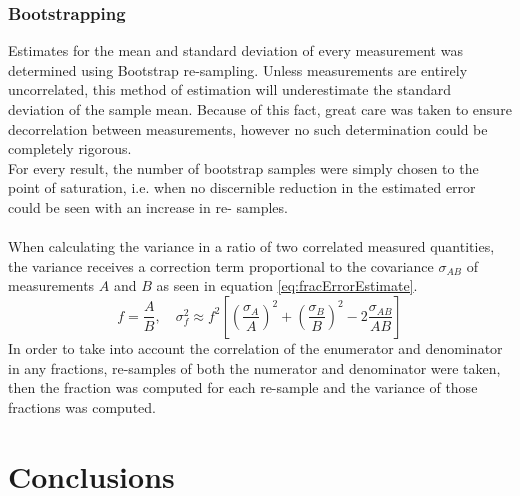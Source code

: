 \documentclass[a4paper,10pt]{book}
\begin{document}
\subsection{Bootstrapping}
Estimates for the mean and standard deviation of every measurement was determined using Bootstrap re-sampling. Unless measurements are entirely uncorrelated, this method of estimation will underestimate the standard deviation of the sample mean. Because of this fact, great care was taken to ensure decorrelation between measurements, however no such determination could be completely rigorous.\\For every result, the number of bootstrap samples were simply chosen to the point of saturation, i.e. when no discernible  reduction in the estimated error could be seen with an increase in re- samples.\\\\When calculating the variance in a ratio of two correlated measured quantities, the variance receives a correction term proportional to the covariance $\sigma_{A B}$ of measurements $A$ and $B$ as seen in equation \eqref{eq:fracErrorEstimate}.
\begin{equation}\label{eq:fracErrorEstimate}
f=\frac{A}{B}, \quad \sigma_{f}^{2} \approx f^{2}\left[\left(\frac{\sigma_{A}}{A}\right)^{2}+\left(\frac{\sigma_{B}}{B}\right)^{2}-2 \frac{\sigma_{A B}}{A B}\right]
\end{equation}
In order to take into account the correlation of the enumerator and denominator in any fractions, re-samples of both the numerator and denominator were taken, then the fraction was computed for each re-sample and the variance of those fractions was computed.

\chapter{Conclusions}\label{chap:conc}
\end{document}
